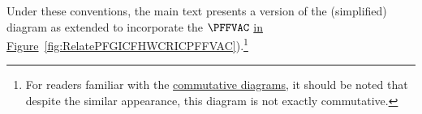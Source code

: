 \documentclass[\econtexRoot/BufferStockTheory]{subfiles}
\begin{document}


Under these conventions, the main text presents a version of the (simplified) diagram as extended to incorporate the $\PFFVAC$ \href{https://econ-ark.github.io/BufferStockTheory/#RelatePFGICFHWCRICPFFVAC}{in Figure}~\ref{fig:RelatePFGICFHWCRICPFFVAC}).\footnote{For readers familiar with the \href{https://en.wikipedia.org/wiki/Commutative_diagram}{commutative diagrams}, it should be noted that despite the similar appearance, this diagram is not exactly commutative.}%

\providecommand{\figName}{}
\renewcommand{\figName}{RelatePFGICFHWCRICPFFVAC}
\providecommand{\figFile}{\figName}

\end{document}
